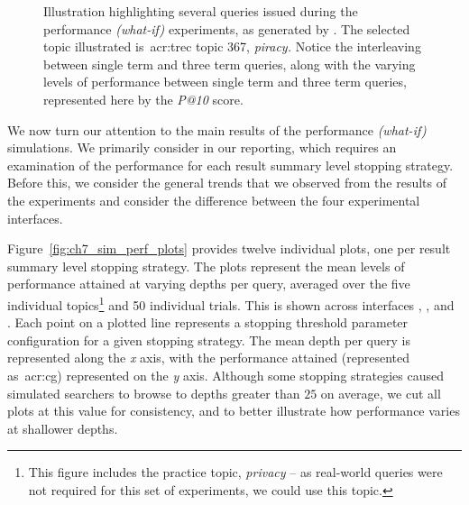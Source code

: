 \begin{figure}[t!]
    \centering
    \caption[Example queries generated by ]{Illustration highlighting several queries issued during the performance \emph{(what-if)} experiments, as generated by . The selected topic illustrated is~\gls{acr:trec} topic 367, \emph{piracy.} Notice the interleaving between single term and three term queries, along with the varying levels of performance between single term and three term queries, represented here by the \emph{P@10} score.}
    \label{fig:ch7_example_queries}
\end{figure}

We now turn our attention to the main results of the performance \emph{(what-if)} simulations. We primarily consider  in our reporting, which requires an examination of the performance for each result summary level stopping strategy. Before this, we consider the general trends that we observed from the results of the experiments and consider the difference between the four experimental interfaces.

Figure~\ref{fig:ch7_sim_perf_plots} provides twelve individual plots, one per result summary level stopping strategy. The plots represent the mean levels of performance attained at varying depths per query, averaged over the five individual topics\footnote{This figure includes the practice topic, \emph{privacy} -- as real-world queries were not required for this set of experiments, we could use this topic.} and 50 individual trials. This is shown across interfaces , ,  and . Each point on a plotted line represents a stopping threshold parameter configuration for a given stopping strategy. The mean depth per query is represented along the \emph{x} axis, with the performance attained (represented as~\gls{acr:cg}) represented on the \emph{y} axis. Although some stopping strategies caused simulated searchers to browse to depths greater than $25$ on average, we cut all plots at this value for consistency, and to better illustrate how performance varies at shallower depths.


